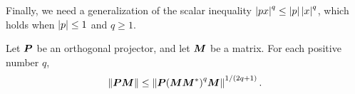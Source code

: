 \documentclass[final]{siamltex}
\newcommand{\notate}[1]{\textcolor{red}{\textbf{[#1]}}}
\begin{document}
\lsp

Finally, we need a generalization of the scalar inequality $\left\vert {px} \right\vert^q \leq \left\vert {p} \right\vert \left\vert {x} \right\vert^q$, which holds when $\left\vert {p} \right\vert \leq 1$ and $q \geq 1$.

\lsp


\begin{proposition} \label{prop:proj-power}
Let $\bm{P}$ be an orthogonal projector, and let $\bm{M}$ be a matrix.
For each positive number $q$,
\begin{equation}
\label{eq:trivial}
\norm{ \mtx{PM} } \leq \norm{ \mtx{P}
{(\mtx{MM}^\adj)}^{q} \mtx{M} }^{1/(2q+1)}.
\end{equation}
\end{proposition}
\end{document}
